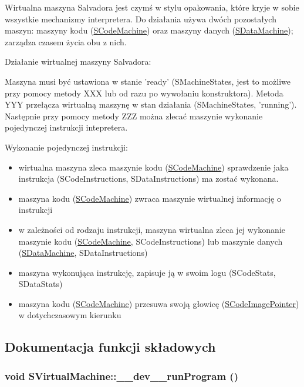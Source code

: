 Wirtualna maszyna Salvadora jest czymś w stylu opakowania, które kryje w sobie wszystkie mechanizmy interpretera. Do działania używa dwóch pozostałych maszyn: maszyny kodu (\hyperlink{classSCodeMachine}{SCodeMachine}) oraz maszyny danych (\hyperlink{classSDataMachine}{SDataMachine}); zarządza czasem życia obu z nich.

Działanie wirtualnej maszyny Salvadora:

Maszyna musi być ustawiona w stanie 'ready' (SMachineStates, jest to możliwe przy pomocy metody XXX lub od razu po wywołaniu konstruktora). Metoda YYY przełącza wirtualną maszynę w stan działania (SMachineStates, 'running'). Następnie przy pomocy metody ZZZ można zlecać maszynie wykonanie pojedynczej instrukcji intepretera.

Wykonanie pojedynczej instrukcji:

\begin{itemize}
\item wirtualna maszyna zleca maszynie kodu (\hyperlink{classSCodeMachine}{SCodeMachine}) sprawdzenie jaka instrukcja (SCodeInstructions, SDataInstructions) ma zostać wykonana.\item maszyna kodu (\hyperlink{classSCodeMachine}{SCodeMachine}) zwraca maszynie wirtualnej informację o instrukcji\item w zależności od rodzaju instrukcji, maszyna wirtualna zleca jej wykonanie maszynie kodu (\hyperlink{classSCodeMachine}{SCodeMachine}, SCodeInstructions) lub maszynie danych (\hyperlink{classSDataMachine}{SDataMachine}, SDataInstructions)\item maszyna wykonująca instrukcję, zapisuje ją w swoim logu (SCodeStats, SDataStats)\item maszyna kodu (\hyperlink{classSCodeMachine}{SCodeMachine}) przesuwa swoją głowicę (\hyperlink{classSCodeImagePointer}{SCodeImagePointer}) w dotychczasowym kierunku \end{itemize}


\subsection{Dokumentacja funkcji składowych}
\hypertarget{classSVirtualMachine_d07f353daaf626f5efeb8bd34818db75}{
\subsubsection[{\_\-\_\-dev\_\-\_\-runProgram}]{\setlength{\rightskip}{0pt plus 5cm}void SVirtualMachine::\_\-\_\-dev\_\-\_\-runProgram ()}}
\label{classSVirtualMachine_d07f353daaf626f5efeb8bd34818db75}


